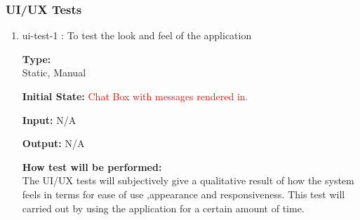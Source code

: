 \documentclass[12pt, titlepage]{article}
\begin{document}
\subsubsection{UI/UX Tests}
\begin{enumerate}
\item{ui-test-1 : To test the look and feel of the application\\}

\textbf{Type:}\\ Static, Manual
					
\textbf{Initial State:} \textcolor{red}{Chat Box with messages rendered in.}
					
\textbf{Input:} N/A
					
\textbf{Output:} N/A
					
\textbf{How test will be performed:}\\ 
The UI/UX tests will subjectively give a qualitative result of how the system feels in terms for ease of use ,appearance and responsiveness. This test will carried out by using the application for a certain amount of time.
\end{enumerate}
\end{document}
